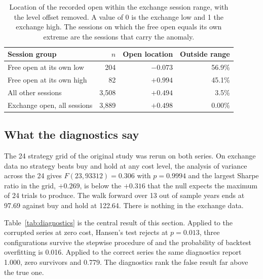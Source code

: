 \documentclass[10pt]{article}
\begin{document}
\begin{table}[H]
\caption{Location of the recorded open within the exchange session range, with the level
offset removed. A value of 0 is the exchange low and 1 the exchange high. The sessions on
which the free open equals its own extreme are the sessions that carry the anomaly.}
\label{tab:openloc}
\begin{tabularx}{\textwidth}{Lrrr}
\toprule
\textbf{Session group} & \textbf{$n$} & \textbf{Open location} & \textbf{Outside range} \\
\midrule
Free open at its own low  & 204   & $-0.073$ & 56.9\% \\
Free open at its own high & 82    & $+0.994$ & 45.1\% \\
All other sessions        & 3,508 & $+0.494$ & 3.5\% \\
\midrule
Exchange open, all sessions & 3,889 & $+0.498$ & 0.00\% \\
\bottomrule
\end{tabularx}
\end{table}

\subsection{What the diagnostics say}

The 24 strategy grid of the original study was rerun on both series. On exchange data no
strategy beats buy and hold at any cost level, the analysis of variance across the 24
gives $F(23,93312)=0.306$ with $p=0.9994$ and the largest Sharpe ratio in the grid,
$+0.269$, is below the $+0.316$ that the null expects the maximum of 24 trials to produce.
The walk forward over 13 out of sample years ends at 97.69 against buy and hold at 122.64.
There is nothing in the exchange data.

Table~\ref{tab:diagnostics} is the central result of this section. Applied to the corrupted
series at zero cost, Hansen's test rejects at $p=0.013$, three configurations survive the
stepwise procedure of \citet{romanowolf2005} and the probability of backtest overfitting
is 0.016. Applied to the correct series the same diagnostics report 1.000, zero survivors
and 0.779. The diagnostics rank the false result far above the true one.
\end{document}
